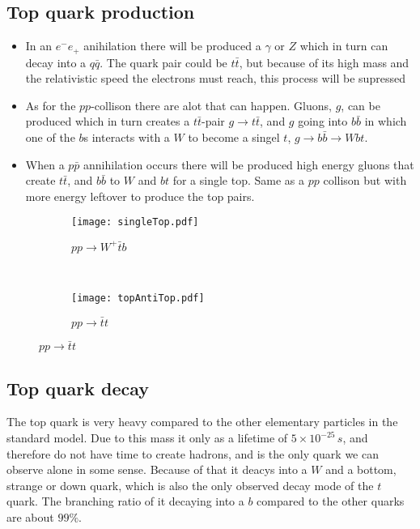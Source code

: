   \subsection{Top quark production}
    \begin{itemize}
      \item
	In an $e^-e_+$ anihilation there will be produced a $\gamma$ or $Z$
	which in turn can decay into a $q\bar{q}$. The quark pair could be $t\bar{t}$,
	but because of its high mass and the relativistic speed the electrons must reach,
	this process will be supressed
      \item
	As for the $pp$-collison there are alot that can happen. Gluons, $g$, can be produced which 
	in turn creates a $t\bar{t}$-pair $g \rightarrow t\bar{t}$, and $g$ going into $b\bar{b}$ in 
	which one of the $b$s interacts with a $W$ to become a singel $t$, $g \rightarrow b\bar{b} %
	\rightarrow Wb t$.
      \item
	When a $p\bar{p}$ annihilation occurs there will be produced high energy gluons
	that create $t\bar{t}$, and $b\bar{b}$ to $W$ and $bt$ for a single top. Same as 
	a $pp$ collison but with more energy leftover to produce the top pairs.
    \end{itemize}

    \begin{figure}[ht]
      \centering
      \begin{subfigure}[b]{0.5\textwidth}
        \texttt{[image: singleTop.pdf]}
	\caption{$pp \rightarrow W^+\bar{t}b$}
        \label{top:1}
      \end{subfigure}%
      ~
      \begin{subfigure}[b]{0.5\textwidth}
        \texttt{[image: topAntiTop.pdf]}
	\caption{$pp \rightarrow \bar{t}t$}
        \label{top:2}
      \end{subfigure}
    \end{figure}

  \subsection{Top quark decay}

    The top quark is very heavy compared to the other elementary particles in the standard model.
    Due to this mass it only as a lifetime of $5\times 10^{-25}\,s$, and therefore do not have time
    to create hadrons, and is the only quark we can observe alone in some sense. 
    Because of that it deacys into a $W$ and a bottom, strange or down quark, which is also the only 
    observed decay mode of the $t$ quark. The branching ratio of it decaying into a $b$ compared
    to the other quarks are about $99\%$.

